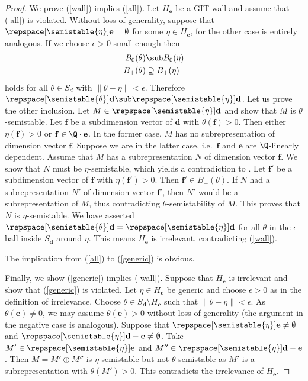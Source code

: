 \documentclass[11pt, a4paper]{amsart}
\begin{document}
	\begin{proof}		
		We prove (\ref{wall}) implies (\ref{all}). Let $H_\mathbf{e}$ be a GIT wall and assume that (\ref{all}) is violated. Without loss of generality, suppose that $\repspace[\semistable{\eta}]{\mathbf{e}} = \emptyset$ for some $\eta \in H_\mathbf{e}$, for the other case is entirely analogous. If we choose $\epsilon > 0$ small enough then
		\begin{align*}
			B_0(\theta) &\sub B_0(\eta) \\
			B_{+}(\theta) &\supseteq B_{+}(\eta)
		\end{align*}
		holds for all $\theta \in S_d$ with $\left\|\theta-\eta\right\| < \epsilon$.
		Therefore $\repspace[\semistable{\theta}]{\mathbf{d}} \sub \repspace[\semistable{\eta}]{\mathbf{d}}$. Let us prove the other inclusion. Let $M \in \repspace[\semistable{\eta}]{\mathbf{d}}$ and show that $M$ is $\theta$-semistable. Let $\mathbf{f}$ be a subdimension vector of $\mathbf{d}$ with $\theta(\mathbf{f}) > 0$. Then either $\eta(\mathbf{f}) > 0$ or $\mathbf{f} \in \Q\cdot \mathbf{e}$. In the former case, $M$ has no subrepresentation of dimension vector $\mathbf{f}$. Suppose we are in the latter case, i.e.~$\mathbf{f}$ and $\mathbf{e}$ are $\Q$-linearly dependent. Assume that $M$ has a subrepresentation $N$ of dimension vector $\mathbf{f}$. We show that $N$ must be $\eta$-semistable, which yields a contradiction to . Let $\mathbf{f}'$ be a subdimension vector of $\mathbf{f}$ with $\eta(\mathbf{f}') > 0$. Then $\mathbf{f}' \in B_+(\theta)$. If $N$ had a subrepresentation $N'$ of dimension vector $\mathbf{f}'$, then $N'$ would be a subrepresentation of $M$, thus contradicting $\theta$-semistability of $M$. This proves that $N$ is $\eta$-semistable. We have asserted $\repspace[\semistable{\theta}]{\mathbf{d}} = \repspace[\semistable{\eta}]{\mathbf{d}}$ for all $\theta$ in the $\epsilon$-ball inside $S_\mathbf{d}$ around $\eta$. This means $H_\mathbf{e}$ is irrelevant, contradicting (\ref{wall}).
		
		The implication from (\ref{all}) to (\ref{generic}) is obvious.
		
		Finally, we show (\ref{generic}) implies (\ref{wall}). Suppose that $H_\mathbf{e}$ is irrelevant and show that (\ref{generic}) is violated. Let $\eta \in H_\mathbf{e}$ be generic and choose $\epsilon > 0$ as in the definition of irrelevance. Choose $\theta \in S_\mathbf{d}\setminus H_\mathbf{e}$ such that $\left\|\theta-\eta\right\| < \epsilon$. 
		As $\theta(\mathbf{e}) \neq 0$, we may assume $\theta(\mathbf{e}) > 0$ without loss of generality (the argument in the negative case is analogous). Suppose that $\repspace[\semistable{\eta}]{\mathbf{e}} \neq \emptyset$ and $\repspace[\semistable{\eta}]{\mathbf{d}-\mathbf{e}} \neq \emptyset$. Take $M' \in \repspace[\semistable{\eta}]{\mathbf{e}}$ and $M'' \in \repspace[\semistable{\eta}]{\mathbf{d}-\mathbf{e}}$. Then $M = M' \oplus M''$ is $\eta$-semistable but not $\theta$-semistable as $M'$ is a subrepresentation with $\theta(M') > 0$. This contradicts the irrelevance of $H_\mathbf{e}$.
	\end{proof}
\end{document}
